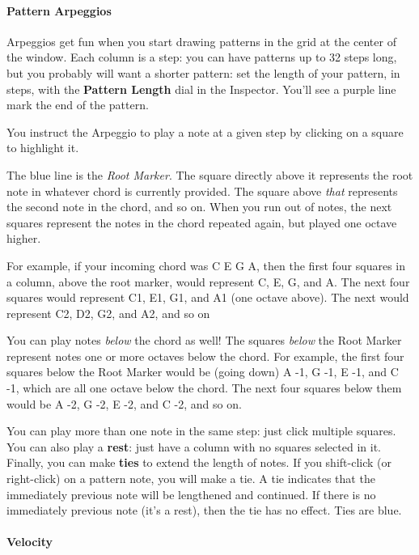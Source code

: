 \documentclass[twoside,10pt]{article}
\begin{document}
\paragraph{Pattern Arpeggios}

Arpeggios get fun when you start drawing patterns in the grid at the center of the window.  Each column is a step: you can have patterns up to 32 steps long, but you probably will want a shorter pattern: set the length of your pattern, in steps, with the {\bf Pattern Length} dial in the Inspector.  You'll see a purple line mark the end of the pattern.

You instruct the Arpeggio to play a note at a given step by clicking on a square to highlight it.

The blue line is the {\it Root Marker}.  The square directly above it represents the root note in whatever chord is currently provided.  The square above {\it that} represents the second note in the chord, and so on.  When you run out of notes, the next squares represent the notes in the chord repeated again, but played one octave higher.

For example, if your incoming chord was C E G A, then the first four squares in a column, above the root marker, would represent C, E, G, and A.  The next four squares would represent C1, E1, G1, and A1 (one octave above).  The next would represent C2, D2, G2, and A2, and so on

You can play notes {\it below} the chord as well!  The squares {\it below} the Root Marker represent notes one or more octaves below the chord.  For example, the first four squares below the Root Marker would be (going down) A -1, G -1, E -1, and C -1, which are all one octave below the chord.  The next four squares below them would be A -2, G -2, E -2, and C -2, and so on.

You can play more than one note in the same step: just click multiple squares.  You can also play a {\bf rest}: just have a column with no squares selected in it.  Finally, you can make {\bf ties} to extend the length of notes.   If you shift-click (or right-click) on a pattern note, you will make a tie.  A tie indicates that the immediately previous note will be lengthened and continued.  If there is no immediately previous note (it's a rest), then the tie has no effect.  Ties are blue.

\paragraph{Velocity}
\end{document}
